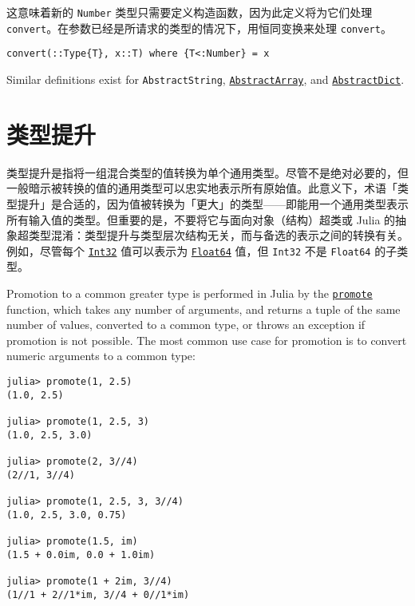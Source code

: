 这意味着新的 \texttt{Number} 类型只需要定义构造函数，因为此定义将为它们处理 \texttt{convert}。在参数已经是所请求的类型的情况下，用恒同变换来处理 \texttt{convert}。




\begin{verbatim}
convert(::Type{T}, x::T) where {T<:Number} = x
\end{verbatim}



Similar definitions exist for \texttt{AbstractString}, \hyperlink{6514416309183787338}{\texttt{AbstractArray}}, and \hyperlink{6373987858401217649}{\texttt{AbstractDict}}.



\hypertarget{701866407360133120}{}


\section{类型提升}



类型提升是指将一组混合类型的值转换为单个通用类型。尽管不是绝对必要的，但一般暗示被转换的值的通用类型可以忠实地表示所有原始值。此意义下，术语「类型提升」是合适的，因为值被转换为「更大」的类型——即能用一个通用类型表示所有输入值的类型。但重要的是，不要将它与面向对象（结构）超类或 Julia 的抽象超类型混淆：类型提升与类型层次结构无关，而与备选的表示之间的转换有关。例如，尽管每个 \hyperlink{10103694114785108551}{\texttt{Int32}} 值可以表示为 \hyperlink{5027751419500983000}{\texttt{Float64}} 值，但 \texttt{Int32} 不是 \texttt{Float64} 的子类型。



Promotion to a common {\textquotedbl}greater{\textquotedbl} type is performed in Julia by the \hyperlink{1760874576431605095}{\texttt{promote}} function, which takes any number of arguments, and returns a tuple of the same number of values, converted to a common type, or throws an exception if promotion is not possible. The most common use case for promotion is to convert numeric arguments to a common type:




\begin{verbatim}
julia> promote(1, 2.5)
(1.0, 2.5)

julia> promote(1, 2.5, 3)
(1.0, 2.5, 3.0)

julia> promote(2, 3//4)
(2//1, 3//4)

julia> promote(1, 2.5, 3, 3//4)
(1.0, 2.5, 3.0, 0.75)

julia> promote(1.5, im)
(1.5 + 0.0im, 0.0 + 1.0im)

julia> promote(1 + 2im, 3//4)
(1//1 + 2//1*im, 3//4 + 0//1*im)
\end{verbatim}



